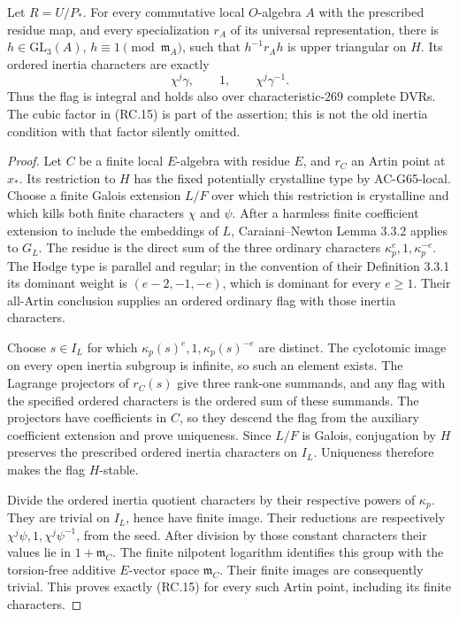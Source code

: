 \begin{theorem}
\label{AC-G65-flag}
Let \(R=U/P_*\).  For every commutative local
\(O\)-algebra \(A\) with the prescribed residue map,
and every specialization \(r_A\) of its universal
representation, there is \(h\in\mathrm{GL}_3(A)\),
\(h\equiv1\pmod{\mathfrak m_A}\), such that
\(h^{-1}r_Ah\) is upper triangular on \(H\).
Its ordered inertia characters are exactly
\[
                 \chi^j\gamma,\qquad1,\qquad
                                  \chi^j\gamma^{-1}.
 \tag{RC.15}
\]
Thus the flag is integral and holds also over
characteristic-\(269\) complete DVRs.  The cubic
factor in (RC.15) is part of the assertion; this
is not the old inertia condition with that factor
silently omitted.
\end{theorem}
\begin{proof}
Let \(C\) be a finite local \(E\)-algebra with residue
\(E\), and \(r_C\) an Artin point at \(x_*\).
Its restriction to \(H\) has the fixed potentially
crystalline type by AC-G65-local.  Choose a finite
Galois extension \(L/F\) over which this restriction
is crystalline and which kills both finite
characters \(\chi\) and \(\psi\).
After a harmless finite coefficient extension to
include the embeddings of \(L\), Caraiani--Newton
Lemma 3.3.2 applies to \(G_L\).
The residue is the direct sum of the three
ordinary characters \(\kappa_p^e,1,\kappa_p^{-e}\).
The Hodge type is parallel and regular; in the
convention of their Definition 3.3.1 its dominant
weight is \((e-2,-1,-e)\), which is dominant for
every \(e\geq1\).
Their all-Artin conclusion supplies an ordered
ordinary flag with those inertia characters.

Choose \(s\in I_L\) for which
\(\kappa_p(s)^e,1,\kappa_p(s)^{-e}\) are distinct.
The cyclotomic image on every open inertia subgroup
is infinite, so such an element exists.
The Lagrange projectors of \(r_C(s)\) give three
rank-one summands, and any flag with the specified
ordered characters is the ordered sum of these
summands.  The projectors have coefficients in
\(C\), so they descend the flag from the auxiliary
coefficient extension and prove uniqueness.
Since \(L/F\) is Galois, conjugation by \(H\)
preserves the prescribed ordered inertia
characters on \(I_L\).  Uniqueness therefore
makes the flag \(H\)-stable.

Divide the ordered inertia quotient characters
by their respective powers of \(\kappa_p\).
They are trivial on \(I_L\), hence have finite
image.  Their reductions are respectively
\(\chi^j\psi,1,\chi^j\psi^{-1}\), from the seed.
After division by those constant characters
their values lie in \(1+\mathfrak m_C\).
The finite nilpotent logarithm identifies this
group with the torsion-free additive
\(E\)-vector space \(\mathfrak m_C\).
Their finite images are consequently trivial.
This proves exactly (RC.15) for every such Artin
point, including its finite characters.


\end{proof}
